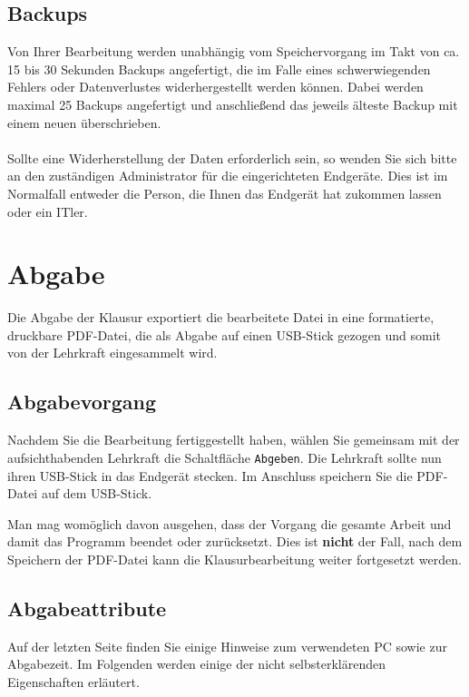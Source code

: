 \documentclass[]{article}
\begin{document}
	\subsection{Backups}
	Von Ihrer Bearbeitung werden unabhängig vom Speichervorgang im Takt von ca. 15 bis 30 Sekunden Backups angefertigt, die im Falle eines schwerwiegenden Fehlers oder Datenverlustes widerhergestellt werden können. Dabei werden maximal 25 Backups angefertigt und anschließend das jeweils älteste Backup mit einem neuen überschrieben. \\\\
	Sollte eine Widerherstellung der Daten erforderlich sein, so wenden Sie sich bitte an den zuständigen Administrator für die eingerichteten Endgeräte. Dies ist im Normalfall entweder die Person, die Ihnen das Endgerät hat zukommen lassen oder ein ITler.
	
	\newpage
	\section{Abgabe}
	Die Abgabe der Klausur exportiert die bearbeitete Datei in eine formatierte, druckbare PDF-Datei, die als Abgabe auf einen USB-Stick gezogen und somit von der Lehrkraft eingesammelt wird.
	\subsection{Abgabevorgang}
	Nachdem Sie die Bearbeitung fertiggestellt haben, wählen Sie gemeinsam mit der aufsichthabenden Lehrkraft die Schaltfläche \texttt{Abgeben}. Die Lehrkraft sollte nun ihren USB-Stick in das Endgerät stecken. Im Anschluss speichern Sie die PDF-Datei auf dem USB-Stick.

	\begin{tcolorbox}[note, title=Hinweis: Endgültigkeit der Abgabe]
		Man mag womöglich davon ausgehen, dass der Vorgang die gesamte Arbeit und damit das Programm beendet oder zurücksetzt. Dies ist \textbf{nicht} der Fall, nach dem Speichern der PDF-Datei kann die Klausurbearbeitung weiter fortgesetzt werden.
	\end{tcolorbox}
	
	\subsection{Abgabeattribute}
	Auf der letzten Seite finden Sie einige Hinweise zum verwendeten PC sowie zur Abgabezeit. Im Folgenden werden einige der nicht selbsterklärenden Eigenschaften erläutert.
	
\end{document}
